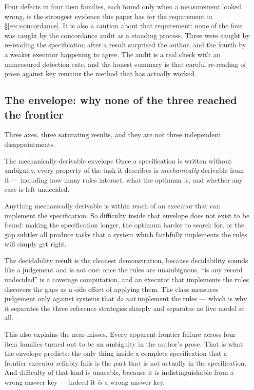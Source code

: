 Four defects in four item families, each found only when a measurement looked wrong, is the strongest evidence this paper has for the requirement in \S\ref{sec:concordance}. It is also a caution about that requirement: none of the four was caught by the concordance audit as a standing process. Three were caught by re-reading the specification after a result surprised the author, and the fourth by a weaker executor happening to agree. The audit is a real check with an unmeasured detection rate, and the honest summary is that careful re-reading of prose against key remains the method that has actually worked.

\subsection{The envelope: why none of the three reached the frontier}\label{sec:envelope}

Three axes, three saturating results, and they are not three independent disappointments.

\begin{claimbox}{The mechanically-derivable envelope}
Once a specification is written without ambiguity, every property of the task it describes is \emph{mechanically} derivable from it --- including how many rules interact, what the optimum is, and whether any case is left undecided.

Anything mechanically derivable is within reach of an executor that can implement the specification. So difficulty inside that envelope does not exist to be found: making the specification longer, the optimum harder to search for, or the gap subtler all produce tasks that a system which faithfully implements the rules will simply get right.
\end{claimbox}

The decidability result is the cleanest demonstration, because decidability sounds like a judgement and is not one: once the rules are unambiguous, ``is any record undecided'' is a coverage computation, and an executor that implements the rules discovers the gaps as a side effect of applying them. The class measures judgement only against systems that \emph{do not} implement the rules --- which is why it separates the three reference strategies sharply and separates no live model at all.

This also explains the near-misses. Every apparent frontier failure across four item families turned out to be an ambiguity in the author's prose. That is what the envelope predicts: the only thing inside a complete specification that a frontier executor reliably fails is the part that is not actually in the specification. And difficulty of that kind is unusable, because it is indistinguishable from a wrong answer key --- indeed it \emph{is} a wrong answer key.

